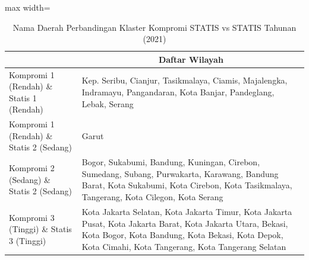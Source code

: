 \begin{table}[H]
\centering
\caption{Nama Daerah Perbandingan Klaster Kompromi STATIS vs STATIS Tahunan (2021)} \label{tab:app2comp_statis_name_2021}
\begin{adjustbox}{max width=\textwidth}
\begin{tabular}{|>{\centering\arraybackslash}p{4cm}|p{10cm}|}
\hline
\multicolumn{1}{|c|}{\textbf{Kategori}} & \multicolumn{1}{c|}{\textbf{Daftar Wilayah}} \\
\hline
Kompromi 1 (Rendah) \& Statis 1 (Rendah) & Kep. Seribu, Cianjur, Tasikmalaya, Ciamis, Majalengka, Indramayu, Pangandaran, Kota Banjar, Pandeglang, Lebak, Serang \\
\hline
Kompromi 1 (Rendah) \& Statis 2 (Sedang) & Garut \\
\hline
Kompromi 2 (Sedang) \& Statis 2 (Sedang) & Bogor, Sukabumi, Bandung, Kuningan, Cirebon, Sumedang, Subang, Purwakarta, Karawang, Bandung Barat, Kota Sukabumi, Kota Cirebon, Kota Tasikmalaya, Tangerang, Kota Cilegon, Kota Serang \\
\hline
Kompromi 3 (Tinggi) \& Statis 3 (Tinggi) & Kota Jakarta Selatan, Kota Jakarta Timur, Kota Jakarta Pusat, Kota Jakarta Barat, Kota Jakarta Utara, Bekasi, Kota Bogor, Kota Bandung, Kota Bekasi, Kota Depok, Kota Cimahi, Kota Tangerang, Kota Tangerang Selatan \\
\hline
\end{tabular}
\end{adjustbox}
\end{table}